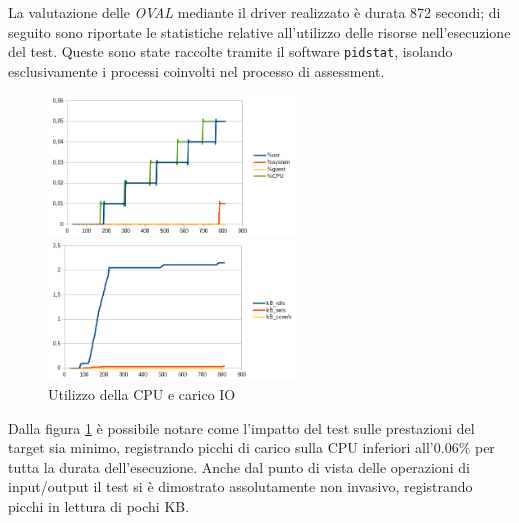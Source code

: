 \documentclass[../main.tex]{subfiles}
\begin{document}
La valutazione delle \textit{OVAL} mediante il driver realizzato è durata 872 secondi; di seguito sono riportate le statistiche relative all'utilizzo delle risorse nell'esecuzione del test.
Queste sono state raccolte tramite il software \texttt{pidstat}, isolando esclusivamente i processi coinvolti nel processo di assessment.
\begin{figure}[H]
 \begin{minipage}[b]{6cm}
   \centering
   \includegraphics[width=6.6cm]{immagini/plot1cpu.png}
 \end{minipage}
 \hspace{2mm} \hspace{3mm}
 \begin{minipage}[b]{9cm}
  \centering
   \includegraphics[width=6.6cm]{immagini/plot1io.png}
 \end{minipage}
 \caption{Utilizzo della CPU e carico IO}\label{ref:plot1cpuio}
\end{figure}
Dalla figura \ref{ref:plot1cpuio} è possibile notare come l'impatto del test sulle prestazioni del target sia minimo, registrando picchi di carico sulla CPU inferiori all'0.06\% per tutta la durata dell'esecuzione. Anche dal punto di vista delle operazioni di input/output il test si è dimostrato assolutamente non invasivo, registrando picchi in lettura di pochi KB. 
\end{document}
